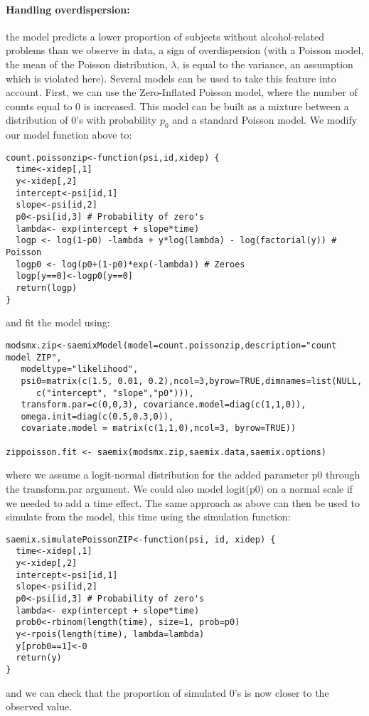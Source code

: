 \paragraph{Handling overdispersion:} the model predicts a lower proportion of subjects without alcohol-related problems than we observe in data, a sign of overdispersion (with a Poisson model, the mean of the Poisson distribution, $\lambda$, is equal to the variance, an assumption which is violated here). Several models can be used to take this feature into account. First, we can use the Zero-Inflated Poisson model, where the number of counts equal to 0 is increased. This model can be built as a mixture between a distribution of 0's with probability $p_0$ and a standard Poisson model. We modify our model function above to:
\begin{verbatim}
count.poissonzip<-function(psi,id,xidep) {
  time<-xidep[,1]
  y<-xidep[,2]
  intercept<-psi[id,1]
  slope<-psi[id,2]
  p0<-psi[id,3] # Probability of zero's
  lambda<- exp(intercept + slope*time)
  logp <- log(1-p0) -lambda + y*log(lambda) - log(factorial(y)) # Poisson
  logp0 <- log(p0+(1-p0)*exp(-lambda)) # Zeroes
  logp[y==0]<-logp0[y==0]
  return(logp)
}
\end{verbatim}
and fit the model using:
\begin{verbatim}
modsmx.zip<-saemixModel(model=count.poissonzip,description="count model ZIP",
   modeltype="likelihood", 
   psi0=matrix(c(1.5, 0.01, 0.2),ncol=3,byrow=TRUE,dimnames=list(NULL, 
      c("intercept", "slope","p0"))), 
   transform.par=c(0,0,3), covariance.model=diag(c(1,1,0)), 
   omega.init=diag(c(0.5,0.3,0)),
   covariate.model = matrix(c(1,1,0),ncol=3, byrow=TRUE))

zippoisson.fit <- saemix(modsmx.zip,saemix.data,saemix.options)
\end{verbatim}
where we assume a logit-normal distribution for the added parameter p0 through the transform.par argument. We could also model logit(p0) on a normal scale if we needed to add a time effect. The same approach as above can then be used to simulate from the model, this time using the simulation function:
\begin{verbatim}
saemix.simulatePoissonZIP<-function(psi, id, xidep) {
  time<-xidep[,1]
  y<-xidep[,2]
  intercept<-psi[id,1]
  slope<-psi[id,2]
  p0<-psi[id,3] # Probability of zero's
  lambda<- exp(intercept + slope*time)
  prob0<-rbinom(length(time), size=1, prob=p0)
  y<-rpois(length(time), lambda=lambda)
  y[prob0==1]<-0
  return(y)
}
\end{verbatim}
and we can check that the proportion of simulated 0's is now closer to the observed value.

